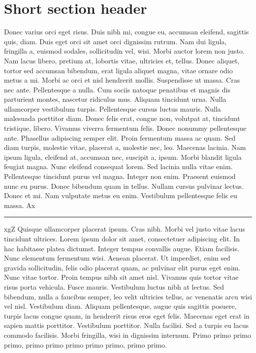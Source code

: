 \documentclass[draft,12pt,twoside,a4paper]{book}
\begin{document}
\section{Short section header}
Donec varius orci eget risus.
Duis nibh mi, congue eu, accumsan eleifend, sagittis quis, diam.
Duis eget orci sit amet orci dignissim rutrum.
Nam dui ligula, fringilla a, euismod sodales, sollicitudin vel, wisi.
Morbi auctor lorem non justo.
Nam lacus libero, pretium at, lobortis vitae, ultricies et, tellus.
Donec aliquet, tortor sed accumsan bibendum, erat ligula aliquet magna,
 vitae ornare odio metus a mi.
Morbi ac orci et nisl hendrerit mollis.
Suspendisse ut massa.
Cras nec ante.
Pellentesque a nulla.
Cum sociis natoque penatibus et magnis dis parturient montes,
 nascetur ridiculus mus.
Aliquam tincidunt urna.
Nulla ullamcorper vestibulum turpis.
Pellentesque cursus luctus mauris.
Nulla malesuada porttitor diam.
Donec felis erat, congue non, volutpat at, tincidunt tristique, libero.
Vivamus viverra fermentum felis.
Donec nonummy pellentesque ante.
Phasellus adipiscing semper elit.
Proin fermentum massa ac quam.
Sed diam turpis, molestie vitae, placerat a, molestie nec, leo.
Maecenas lacinia.
Nam ipsum ligula, eleifend at, accumsan nec, suscipit a, ipsum.
Morbi blandit ligula feugiat magna.
Nunc eleifend consequat lorem.
Sed lacinia nulla vitae enim.
Pellentesque tincidunt purus vel magna.
Integer non enim.
Praesent euismod nunc eu purus.
Donec bibendum quam in tellus.
Nullam cursus pulvinar lectus.
Donec et mi.
Nam vulputate metus eu enim.
Vestibulum pellentesque felis eu massa.
Ax\rule{3mm}{4.914ex}xgZ
Quisque ullamcorper placerat ipsum.
Cras nibh.
Morbi vel justo vitae lacus tincidunt ultrices.
Lorem ipsum dolor sit amet, consectetuer adipiscing elit.
In hac habitasse platea dictumst.
Integer tempus convallis augue.
Etiam facilisis.
Nunc elementum fermentum wisi.
Aenean placerat.
Ut imperdiet, enim sed gravida sollicitudin, felis odio placerat quam,
 ac pulvinar elit purus eget enim.
Nunc vitae tortor.
Proin tempus nibh sit amet nisl.
Vivamus quis tortor vitae risus porta vehicula.
Fusce mauris.
Vestibulum luctus nibh at lectus.
Sed bibendum, nulla a faucibus semper, leo velit ultricies tellus,
 ac venenatis arcu wisi vel nisl.
Vestibulum diam.
Aliquam pellentesque, augue quis sagittis posuere, turpis lacus congue quam,
 in hendrerit risus eros eget felis.
Maecenas eget erat in sapien mattis porttitor.
Vestibulum porttitor.
Nulla facilisi.
Sed a turpis eu lacus commodo facilisis.
Morbi fringilla, wisi in dignissim internum.
Primo primo primo primo, primo primo primo primo primo, primo primo.
\end{document}
